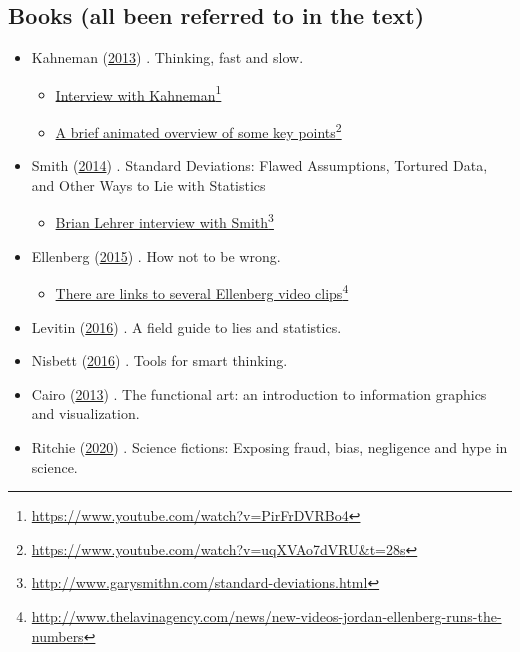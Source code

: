 \documentclass[
  10pt,
  b5paper]{book}
\providecommand{\tightlist}{%
  \setlength{\itemsep}{0pt}\setlength{\parskip}{0pt}}
\begin{document}
\hypertarget{books-all-been-referred-to-in-the-text}{%
\subsection{Books (all been referred to in the text)}\label{books-all-been-referred-to-in-the-text}}

\begin{itemize}
\tightlist
\item
  Kahneman (\protect\hyperlink{ref-kahneman_2013}{2013}) . Thinking, fast and slow.

  \begin{itemize}
  \tightlist
  \item
    \href{https://www.youtube.com/watch?v=PirFrDVRBo4}{Interview with Kahneman}\footnote{\url{https://www.youtube.com/watch?v=PirFrDVRBo4}}
  \item
    \href{https://www.youtube.com/watch?v=uqXVAo7dVRU\&t=28s}{A brief animated overview of some key points}\footnote{\url{https://www.youtube.com/watch?v=uqXVAo7dVRU\&t=28s}}
  \end{itemize}
\item
  Smith (\protect\hyperlink{ref-smith-sd}{2014}) . Standard Deviations: Flawed Assumptions, Tortured Data, and Other Ways to Lie with Statistics

  \begin{itemize}
  \tightlist
  \item
    \href{http://www.garysmithn.com/standard-deviations.html}{Brian Lehrer interview with Smith}\footnote{\url{http://www.garysmithn.com/standard-deviations.html}}
  \end{itemize}
\item
  Ellenberg (\protect\hyperlink{ref-ellenberg_2015}{2015}) . How not to be wrong.

  \begin{itemize}
  \tightlist
  \item
    \href{http://www.thelavinagency.com/news/new-videos-jordan-ellenberg-runs-the-numbers}{There are links to several Ellenberg video clips}\footnote{\url{http://www.thelavinagency.com/news/new-videos-jordan-ellenberg-runs-the-numbers}}
  \end{itemize}
\item
  Levitin (\protect\hyperlink{ref-levitin_2016}{2016}) . A field guide to lies and statistics.
\item
  Nisbett (\protect\hyperlink{ref-nisbett}{2016}) . Tools for smart thinking.
\item
  Cairo (\protect\hyperlink{ref-cairo_2013}{2013}) . The functional art: an introduction to information
  graphics and visualization.
\item
  Ritchie (\protect\hyperlink{ref-ritchie2020science}{2020}) . Science fictions: Exposing fraud, bias,
  negligence and hype in science.
\end{itemize}
\end{document}
